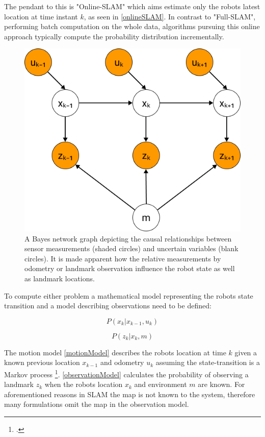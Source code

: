The pendant to this is "Online-SLAM" which aims estimate only the robots latest location at time instant $ k $, as seen in \ref{onlineSLAM}. In contrast to "Full-SLAM", performing batch computation on the whole data, algorithms pursuing this online approach typically compute the probability distribution incrementally. 

\begin{figure}
	\centering
	\includegraphics[width=0.4\linewidth]{img/SlamGraphical}
	\caption{
		A Bayes network graph depicting the causal relationships between sensor measurements (shaded circles) and uncertain variables (blank circles). It is made apparent how the relative measurements by odometry or landmark observation influence the robot state as well as landmark locations. 
	}
	\label{fig:slamGraphical}
\end{figure}

To compute either problem a mathematical model representing the robots state transition and a model describing observations need to be defined:

\begin{equation}\label{motionModel}
	P(x_{k} | x_{k-1}, u_{k})
\end{equation}

\begin{equation}\label{observationModel}
	P(z_{k} | x_{k}, m)
\end{equation}

The motion model \ref{motionModel} describes the robots location at time $ k $ given a known previous location $ x_{k-1} $ and odometry $ u_{k} $ assuming the state-transition is a Markov process \footcite{haeneltMarvoModel2006}.
\ref{observationModel} calculates the probability of observing a landmark $ z_{k} $ when the robots location $ x_{k} $ and environment $ m $ are known. For aforementioned reasons in SLAM the map is not known to the system, therefore many formulations omit the map in the observation model.


